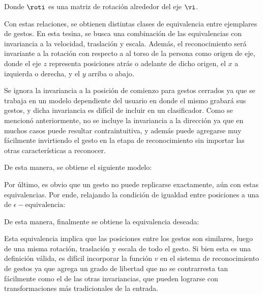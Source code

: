 Donde $\roti$ es una matriz de rotación alrededor del eje $\vi$. 


Con estas relaciones, se obtienen distintas clases de equivalencia entre ejemplares de gestos. En esta tesina, se busca una combinación de las equivalencias con invariancia a la velocidad, traslación y escala. Además, el reconocimiento será invariante a la rotación con respecto a al torso de la persona como origen de eje, donde el eje $z$ representa posiciones atrás o adelante de dicho origen, el $x$ a izquierda o derecha, y el $y$ arriba o abajo.

Se ignora la invariancia a la posición de comienzo para gestos cerrados ya que se trabaja en un modelo dependiente del usuario en donde el mismo grabará sus gestos, y dicha invariancia es difícil de incluir en un clasificador. Como se mencionó anteriormente, no se incluye la invariancia a la dirección ya que en muchos casos puede resultar contraintuitiva, y además puede agregarse muy fácilmente invirtiendo el gesto en la etapa de reconocimiento sin importar las otras características a reconocer. 

De esta manera, se obtiene el siguiente modelo:


\newcommand{\eequiv}{=_{\epsilon}}

Por último, es obvio que un gesto no puede replicarse exactamente, aún con estas equivalencias. Por ende, relajando la condición de igualdad entre posiciones a una de $\epsilon-\text{equivalencia}$:


\tci{a &\eequiv b}{
& \norm{a-b} < \epsilon
\\& \text{donde} \; \epsilon \in \reals, \; a,b \in \reals^3
\\& \text{y} \; \norm{\cdot} \quad \text{es una norma en $\reals^3$}
}

De esta manera, finalmente se obtiene la equivalencia deseada:


\equivalencia{ m}{
 &\existsv, \; \existsroti 
 \\& \existsb, \; \existsa
\\& c(t) \eequiv a (\roti c'(v(t)))+b
}

Esta equivalencia implica que las posiciones entre los gestos son similares, luego de una misma rotación, traslación y escala de todo el gesto. Si bien esta es una definición válida, es difícil incorporar la función $v$ en el sistema de reconocimiento de gestos ya que agrega un grado de libertad que no se contrarresta tan fácilmente como el de las otras invariancias, que pueden lograrse con transformaciones más tradicionales de la entrada.

